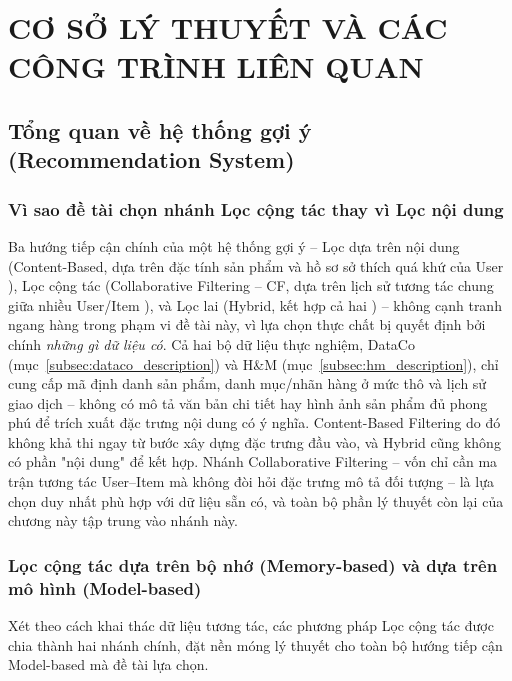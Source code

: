 \chapter{CƠ SỞ LÝ THUYẾT VÀ CÁC CÔNG TRÌNH LIÊN QUAN}
\label{chap:lythuyet}

\section{Tổng quan về hệ thống gợi ý (Recommendation System)}
\label{sec:tongquan_rs}

\subsection{Vì sao đề tài chọn nhánh Lọc cộng tác thay vì Lọc nội dung}
\label{subsec:khainiem_rs}

Ba hướng tiếp cận chính của một hệ thống gợi ý -- Lọc dựa trên nội dung (Content-Based, dựa trên đặc tính sản phẩm và hồ sơ sở thích quá khứ của User \parencite{schafer2001commerce}), Lọc cộng tác (Collaborative Filtering -- CF, dựa trên lịch sử tương tác chung giữa nhiều User/Item \parencite{koren2009matrix, sarwar2001item}), và Lọc lai (Hybrid, kết hợp cả hai \parencite{cheng2016wide, guo2017deepfm}) -- không cạnh tranh ngang hàng trong phạm vi đề tài này, vì lựa chọn thực chất bị quyết định bởi chính \emph{những gì dữ liệu có}. Cả hai bộ dữ liệu thực nghiệm, DataCo (mục~\ref{subsec:dataco_description}) và H\&M (mục~\ref{subsec:hm_description}), chỉ cung cấp mã định danh sản phẩm, danh mục/nhãn hàng ở mức thô và lịch sử giao dịch -- không có mô tả văn bản chi tiết hay hình ảnh sản phẩm đủ phong phú để trích xuất đặc trưng nội dung có ý nghĩa. Content-Based Filtering do đó không khả thi ngay từ bước xây dựng đặc trưng đầu vào, và Hybrid cũng không có phần "nội dung" để kết hợp. Nhánh Collaborative Filtering -- vốn chỉ cần ma trận tương tác User--Item mà không đòi hỏi đặc trưng mô tả đối tượng \parencite{su2009survey} -- là lựa chọn duy nhất phù hợp với dữ liệu sẵn có, và toàn bộ phần lý thuyết còn lại của chương này tập trung vào nhánh này.

\subsection{Lọc cộng tác dựa trên bộ nhớ (Memory-based) và dựa trên mô hình (Model-based)}
\label{subsec:memory_model_based}

Xét theo cách khai thác dữ liệu tương tác, các phương pháp Lọc cộng tác được chia thành hai nhánh chính, đặt nền móng lý thuyết cho toàn bộ hướng tiếp cận Model-based mà đề tài lựa chọn.

